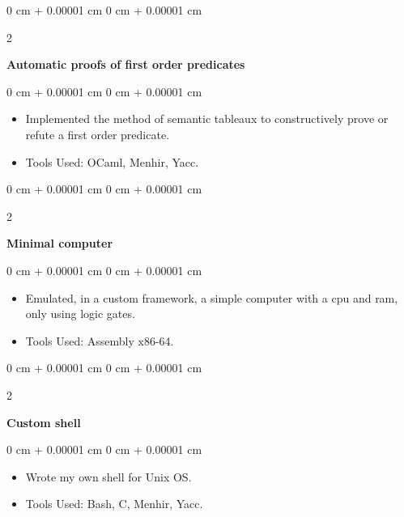 \documentclass[10pt, letterpaper]{article}
\newenvironment{highlights}{
    \begin{itemize}[
        topsep=0.10 cm,
        parsep=0.10 cm,
        partopsep=0pt,
        itemsep=0pt,
        leftmargin=0 cm + 10pt
    ]
}{
    \end{itemize}
} %
\newenvironment{onecolentry}{
    \begin{adjustwidth}{
        0 cm + 0.00001 cm
    }{
        0 cm + 0.00001 cm
    }
}{
    \end{adjustwidth}
} %
\newenvironment{twocolentry}[2][]{
    \onecolentry
    \def\secondColumn{#2}
    \setcolumnwidth{\fill, 4.5 cm}
    \begin{paracol}{2}
}{
    \switchcolumn \raggedleft \secondColumn
    \end{paracol}
    \endonecolentry
} %
\begin{document}
        \vspace{0.2 cm}
        
        
        
        \begin{twocolentry}{
             }
            \textbf{Automatic proofs of first order predicates}\end{twocolentry}

        \vspace{0.10 cm}
        \begin{onecolentry}
            \begin{highlights}
                \item Implemented the method of semantic tableaux to constructively prove or refute a first order predicate.
                \item Tools Used: OCaml, Menhir, Yacc.
            \end{highlights}
        \end{onecolentry}



        \vspace{0.2 cm}
        
        \begin{twocolentry}{
            \href{}{}
        }
            \textbf{Minimal computer}\end{twocolentry}

        \vspace{0.10 cm}
        \begin{onecolentry}
            \begin{highlights}
                \item Emulated, in a custom framework, a simple computer with a cpu and ram, only using logic gates.
                \item Tools Used: Assembly x86-64.
            \end{highlights}
        \end{onecolentry}

        \vspace{0.2 cm}        
        
        \begin{twocolentry}{
            \href{}{}
        }
            \textbf{Custom shell}\end{twocolentry}

        \vspace{0.10 cm}
        \begin{onecolentry}
            \begin{highlights}
                \item Wrote my own shell for Unix OS.
                \item Tools Used: Bash, C, Menhir, Yacc.
            \end{highlights}
        \end{onecolentry}
\end{document}
